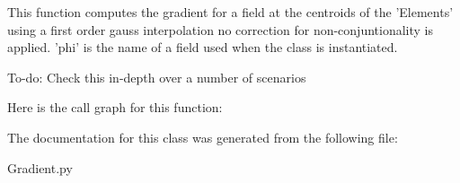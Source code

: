\begin{DoxyVerb}This function computes the gradient for a field at the centroids of 
the 'Elements' using a first order gauss interpolation no correction for 
non-conjuntionality is applied. 'phi' is the name of a field 
used when the class is instantiated.

To-do: Check this in-depth over a number of scenarios
\end{DoxyVerb}
 Here is the call graph for this function\+:


The documentation for this class was generated from the following file\+:\begin{DoxyCompactItemize}
\item 
Gradient.\+py\end{DoxyCompactItemize}
